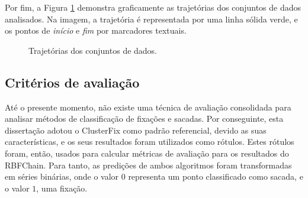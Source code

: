 \documentclass[msc, classic, a4paper]{ufbathesis}
\begin{document}
Por fim, a Figura \ref{fig:trajetorias} demonstra graficamente as trajetórias dos conjuntos de dados analisados.
Na imagem, a trajetória é representada por uma linha sólida verde, e os pontos de \textit{início} e \textit{fim} por marcadores textuais.

\begin{figure}[ht]%
\centering
{}%
\qquad
{}%
\caption{Trajetórias dos conjuntos de dados.}
\label{fig:trajetorias}%
\end{figure}

\subsection{Critérios de avaliação}

Até o presente momento, não existe uma técnica de avaliação consolidada para analisar métodos de classificação de fixações e sacadas.
Por conseguinte, esta dissertação adotou o ClusterFix como padrão referencial, devido as suas características, e os seus resultados foram utilizados como rótulos.
Estes rótulos foram, então, usados para calcular métricas de avaliação para os resultados do RBFChain.
Para tanto, as predições de ambos algoritmos foram transformadas em séries binárias, onde o valor $0$ representa um ponto classificado como sacada, e o valor $1$, uma fixação.
\end{document}
